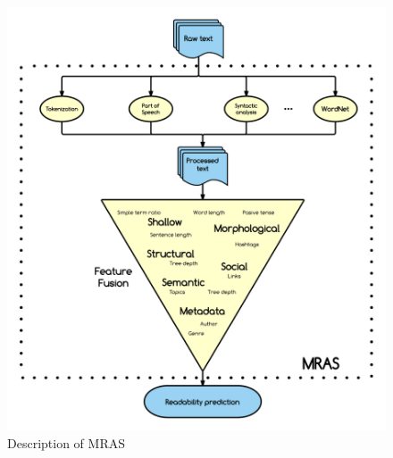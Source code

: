 \documentclass[12pt]{article}
\begin{document}




\begin{figure}[h]
\includegraphics[width=\textwidth]{pipelineGraph}
\caption{Description of MRAS}
\label{fig:pipeline}
\end{figure}
\end{document}
